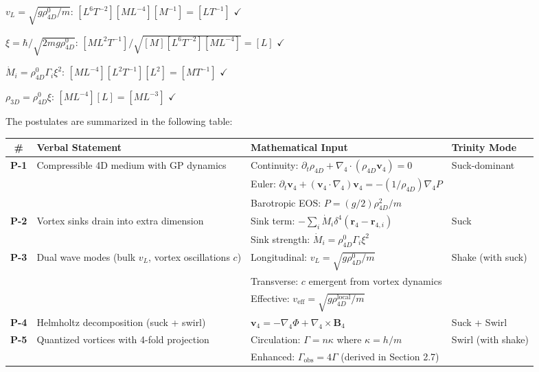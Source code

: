 \begin{tcolorbox}[title=Dimensional Check]
$v_L = \sqrt{g \rho_{4D}^0 / m}$: $[L^6 T^{-2}] [M L^{-4}] [M^{-1}] = [L T^{-1}]$ $\checkmark$

$\xi = \hbar / \sqrt{2 m g \rho_{4D}^0}$: $[M L^2 T^{-1}] / \sqrt{[M] [L^6 T^{-2}] [M L^{-4}]} = [L]$ $\checkmark$

$\dot{M}_i = \rho_{4D}^0 \Gamma_i \xi^2$: $[M L^{-4}] [L^2 T^{-1}] [L^2] = [M T^{-1}]$ $\checkmark$

$\rho_{3D} = \rho_{4D}^0 \xi$: $[M L^{-4}] [L] = [M L^{-3}]$ $\checkmark$
\end{tcolorbox}

The postulates are summarized in the following table:

\begin{table}[H]
\centering
\begin{tabularx}{\textwidth}{|c|Y|Y|Y|}
\hline
\# & Verbal Statement & Mathematical Input & Trinity Mode \\
\hline
\textbf{P-1} & Compressible 4D medium with GP dynamics & Continuity: $\partial_t \rho_{4D} + \nabla_4 \cdot (\rho_{4D} \mathbf{v}_4) = 0$ & Suck-dominant \\
& & Euler: $\partial_t \mathbf{v}_4 + (\mathbf{v}_4 \cdot \nabla_4) \mathbf{v}_4 = -(1/\rho_{4D}) \nabla_4 P$ &  \\
& & Barotropic EOS: $P = (g/2) \rho_{4D}^2 / m$ &  \\
\hline
\textbf{P-2} & Vortex sinks drain into extra dimension & Sink term: $-\sum_i \dot{M}_i \delta^4(\mathbf{r}_4 - \mathbf{r}_{4,i})$ & Suck \\
& & Sink strength: $\dot{M}_i = \rho_{4D}^0 \Gamma_i \xi^2$ &  \\
\hline
\textbf{P-3} & Dual wave modes (bulk $v_L$, vortex oscillations $c$) & Longitudinal: $v_L = \sqrt{g \rho_{4D}^0 / m}$ & Shake (with suck) \\
& & Transverse: $c$ emergent from vortex dynamics &  \\
& & Effective: $v_{\text{eff}} = \sqrt{g \rho_{4D}^{\text{local}} / m}$ &  \\
\hline
\textbf{P-4} & Helmholtz decomposition (suck + swirl) & $\mathbf{v}_4 = -\nabla_4 \Phi + \nabla_4 \times \mathbf{B}_4$ & Suck + Swirl \\
\hline
\textbf{P-5} & Quantized vortices with 4-fold projection & Circulation: $\Gamma = n \kappa$ where $\kappa = h / m$ & Swirl (with shake) \\
& & Enhanced: $\Gamma_{\text{obs}} = 4 \Gamma$ (derived in Section 2.7) &  \\

\end{tabularx}
\end{table}
